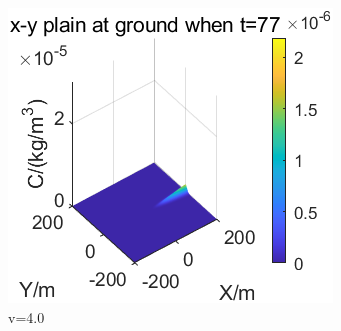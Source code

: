 \documentclass{article}
\begin{document}
\begin{figure}[htbp]
\begin{minipage}{0.33\textwidth}
		\end{minipage}
		\begin{minipage}{0.33\textwidth}
			\includegraphics[width=\textwidth]{pics/v=4,t=77.7.png}
		\end{minipage}
		\caption{v=4.0}
		\label{fig18}
	\end{figure}
    \clearpage
\end{document}
